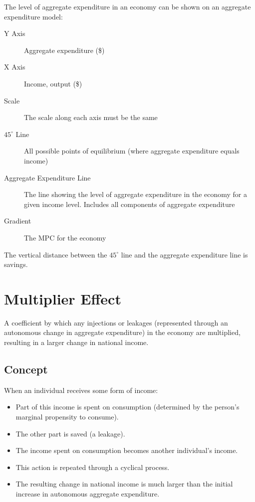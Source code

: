 \documentclass[a4paper,11pt]{report}
\begin{document}

The level of aggregate expenditure in an economy can be shown on an aggregate
expenditure model:

\begin{description}
\item [Y Axis] Aggregate expenditure (\$)
\item [X Axis] Income, output (\$)
\item [Scale] The scale along each axis must be the same
\item [$45^\circ$ Line] All possible points of equilibrium (where aggregate
	expenditure equals income)
\item [Aggregate Expenditure Line] The line showing the level of aggregate
	expenditure in the economy for a given income level. Includes all components
	of aggregate expenditure
\item [Gradient] The MPC for the economy
\end{description}

The vertical distance between the $45^\circ$ line and the aggregate expenditure
line is savings.


\section{Multiplier Effect}

A coefficient by which any injections or leakages (represented through an
autonomous change in aggregate expenditure) in the economy are multiplied,
resulting in a larger change in national income.

\subsection{Concept}

When an individual receives some form of income:

\begin{itemize}
\item Part of this income is spent on consumption (determined by the person's
	marginal propensity to consume).
\item The other part is saved (a leakage).
\item The income spent on consumption becomes another individual's income.
\item This action is repeated through a cyclical process.
\item The resulting change in national income is much larger than the initial
	increase in autonomous aggregate expenditure.
\end{itemize}
\end{document}
